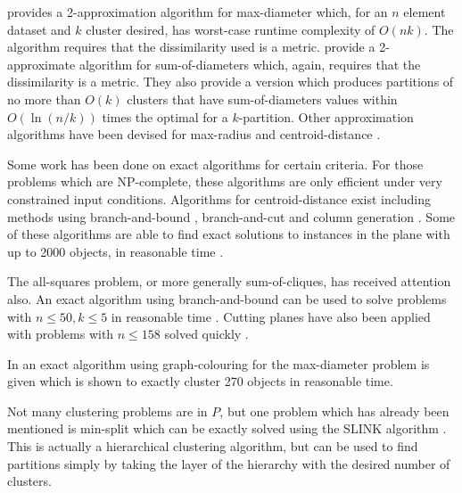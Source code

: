 \citet{gonzalez1985clustering} provides a 2-approximation algorithm for
max-diameter which, for an $n$ element dataset and $k$ cluster desired, has
worst-case runtime complexity of $O(nk)$.  The algorithm requires that the
dissimilarity used is a metric.  \citet{doddi2000approximation} provide a
2-approximate algorithm for sum-of-diameters which, again, requires that the
dissimilarity is a metric.  They also provide a version which produces
partitions of no more than $O(k)$ clusters that have sum-of-diameters values
within $O(\ln(n/k))$ times the optimal for a $k$-partition.  Other
approximation algorithms have been devised for max-radius
\citep{wirth04approx} and centroid-distance \citep{cormode2008approximation}.

Some work has been done on exact algorithms for certain criteria.  For those
problems which are NP-complete, these algorithms are only efficient under very
constrained input conditions.  Algorithms for centroid-distance exist
including methods using branch-and-bound \citep{brusco2006repetitive},
branch-and-cut \citep{aloise09exact} and column generation
\citep{merle1999interior}.  Some of these algorithms are able to find exact
solutions to instances in the plane with up to 2000 objects, in reasonable
time \citep{aloise09exact}.

The all-squares problem, or more generally sum-of-cliques, has received
attention also.  An exact algorithm using branch-and-bound
\citep{klein1991optimal} can be used to solve problems with $n \leq 50, k \leq
5$ in reasonable time \citep{hansen1997mathprog}.  Cutting planes have also
been applied with problems with $n \leq 158$ solved quickly
\citep{hansen1997mathprog,palubeckis1997branch}.

In \citet{hansen1978complete} an exact algorithm using graph-colouring for the
max-diameter problem is given which is shown to exactly cluster 270 objects in
reasonable time.

Not many clustering problems are in $P$, but one problem which has already
been mentioned is min-split which can be exactly solved using the SLINK
algorithm \citep{johnson67hierarchical,sibson1973slink}.  This is actually a
hierarchical clustering algorithm, but can be used to find partitions simply
by taking the layer of the hierarchy with the desired number of clusters.






